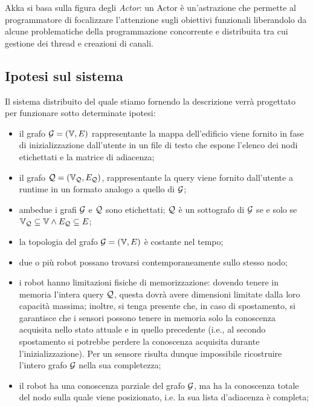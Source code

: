 \documentclass{llncs}
\begin{document}
Akka si basa sulla figura degli \emph{Actor}: un Actor è un'astrazione che permette
al programmatore di focalizzare l'attenzione sugli obiettivi funzionali liberandolo
da alcune problematiche della programmazione
concorrente e distribuita tra cui gestione dei thread e creazioni di canali.
%
\subsection{Ipotesi sul sistema}
\label{sec:hypotesis}
Il sistema distribuito del quale stiamo fornendo la descrizione verrà progettato per funzionare
sotto determinate ipotesi:
\begin{itemize}
\item il grafo $\mathcal{G} = ( \mathbb{V}, E)$ rappresentante la mappa dell'edificio viene fornito
  in fase di inizializzazione dall'utente in un
  file di testo che espone l'elenco dei nodi etichettati e la matrice di adiacenza;
\item il grafo  $\mathcal{Q} = (\mathbb{V}_{\mathcal{Q}}, E_{\mathcal{Q}})$, rappresentante la query viene fornito dall'utente
  a runtime in un formato analogo a quello di $\mathcal{G}$;
\item ambedue i grafi $\mathcal{G}$ e $\mathcal{Q}$ sono etichettati; $\mathcal{Q}$ è un sottografo di $\mathcal{G}$ se e solo se
  $\mathbb{V}_{\mathcal{Q}} \subseteq \mathbb{V} \wedge E_{\mathcal{Q}} \subseteq E$;
\item la topologia del grafo $\mathcal{G} = ( \mathbb{V}, E)$ è costante nel tempo;
\item due o più robot possano trovarsi contemporaneamente sullo stesso nodo;
\item i robot hanno limitazioni fisiche di memorizzazione:
  dovendo tenere in memoria l'intera query $\mathcal{Q}$, questa dovrà avere
  dimensioni limitate dalla loro capacità massima; inoltre,
  si tenga presente che, in caso di spostamento, si garantisce che i sensori
  possono tenere in memoria solo la conoscenza acquisita nello stato attuale e in quello
  precedente (i.e., al secondo spostamento si potrebbe perdere la conoscenza acquisita
  durante l'inizializzazione).
  Per un sensore risulta dunque impossibile ricostruire l'intero grafo $\mathcal{G}$ nella sua completezza;
\item il robot ha una conoscenza parziale del grafo $\mathcal{G}$, ma ha la conoscenza
  totale del nodo sulla quale viene posizionato, i.e. la sua lista d'adiacenza è completa;
\end{itemize}
%
%
\end{document}
